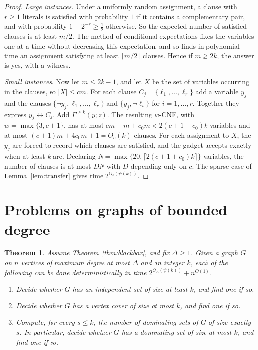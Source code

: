 \documentclass[11pt]{amsart}
\newtheorem{theorem}{Theorem}[section]
\theoremstyle{definition}
\theoremstyle{remark}
\begin{document}
\begin{proof}
\emph{Large instances.} Under a uniformly random assignment, a clause with $r\ge1$ literals is satisfied with probability $1$ if it contains a complementary pair, and with probability $1-2^{-r}\ge\frac12$ otherwise. So the expected number of satisfied clauses is at least $m/2$. The method of conditional expectations fixes the variables one at a time without decreasing this expectation, and so finds in polynomial time an assignment satisfying at least $\lceil m/2\rceil$ clauses. Hence if $m\ge 2k$, the answer is yes, with a witness.

\emph{Small instances.} Now let $m\le 2k-1$, and let $X$ be the set of variables occurring in the clauses, so $|X|\le cm$. For each clause $C_j=\{\ell_1,\dots,\ell_r\}$ add a variable $y_j$ and the clauses $\{\neg y_j,\ell_1,\dots,\ell_r\}$ and $\{y_j,\neg\ell_i\}$ for $i=1,\dots,r$. Together they express $y_j\leftrightarrow C_j$. Add $\Gamma^{\ge k}(y;z)$. The resulting $w$-CNF, with $w=\max\{3,c+1\}$, has at most $cm+m+c_0m<2(c+1+c_0)k$ variables and at most $(c+1)m+4c_0m+1=O_c(k)$ clauses. For each assignment to $X$, the $y_j$ are forced to record which clauses are satisfied, and the gadget accepts exactly when at least $k$ are. Declaring $N=\max\{20,\lceil 2(c+1+c_0)k\rceil\}$ variables, the number of clauses is at most $DN$ with $D$ depending only on $c$. The sparse case of Lemma~\ref{lem:transfer} gives time $2^{O_c(\psi(k))}$.
\end{proof}

\section{Problems on graphs of bounded degree}

\begin{theorem}\label{thm:bdeg}
Assume Theorem~\ref{thm:blackbox}, and fix $\Delta\ge1$. Given a graph $G$ on $n$ vertices of maximum degree at most $\Delta$ and an integer $k$, each of the following can be done deterministically in time $2^{O_\Delta(\psi(k))}+n^{O(1)}$.
\begin{enumerate}[label=(\alph*)]
\item Decide whether $G$ has an independent set of size at least $k$, and find one if so.
\item Decide whether $G$ has a vertex cover of size at most $k$, and find one if so.
\item Compute, for every $s\le k$, the number of dominating sets of $G$ of size exactly $s$. In particular, decide whether $G$ has a dominating set of size at most $k$, and find one if so.
\end{enumerate}
\end{theorem}
\end{document}
